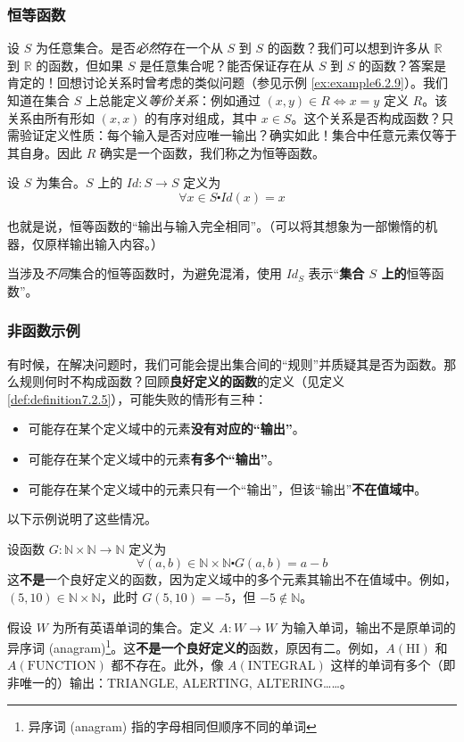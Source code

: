 \subsubsection*{恒等函数}

设 $S$ 为任意集合。是否\emph{必然}存在一个从 $S$ 到 $S$ 的函数？我们可以想到许多从 $\mathbb{R}$ 到 $\mathbb{R}$ 的函数，但如果 $S$ 是任意集合呢？能否保证存在从 $S$ 到 $S$ 的函数？答案是肯定的！回想讨论关系时曾考虑的类似问题（参见示例 \ref{ex:example6.2.9}）。我们知道在集合 $S$ 上总能定义\emph{等价关系}：例如通过 $(x, y) \in R \iff x = y$ 定义 $R$。该关系由所有形如 $(x, x)$ 的有序对组成，其中 $x \in S$。这个关系是否构成函数？只需验证定义性质：每个输入是否对应唯一输出？确实如此！集合中任意元素仅等于其自身。因此 $R$ 确实是一个函数，我们称之为恒等函数。

\begin{definition}[恒等函数]
    设 $S$ 为集合。$S$ 上的 $Id : S \to S$ 定义为
    \[\forall x \in S \centerdot Id(x) = x\]
\end{definition}

也就是说，恒等函数的``输出与输入完全相同''。（可以将其想象为一部懒惰的机器，仅原样输出输入内容。）

当涉及\emph{不同}集合的恒等函数时，为避免混淆，使用 $Id_S$ 表示``\textbf{集合 $S$ 上的}恒等函数''。

\subsubsection*{非函数示例}

有时候，在解决问题时，我们可能会提出集合间的``规则''并质疑其是否为函数。那么规则何时不构成函数？回顾\textbf{良好定义的函数}的定义（见定义 \ref{def:definition7.2.5}），可能失败的情形有三种：

\begin{itemize}
    \item 可能存在某个定义域中的元素\textbf{没有对应的``输出''}。
    \item 可能存在某个定义域中的元素\textbf{有多个``输出''}。
    \item 可能存在某个定义域中的元素只有一个``输出''，但该``输出''\textbf{不在值域中}。
\end{itemize}
以下示例说明了这些情况。

\begin{example}
    设函数 $G : \mathbb{N} \times \mathbb{N} \to \mathbb{N}$ 定义为
    \[\forall (a, b) \in \mathbb{N} \times \mathbb{N} \centerdot G(a, b) = a - b\]
    这\textbf{不是}一个良好定义的函数，因为定义域中的多个元素其输出不在值域中。例如，$(5, 10) \in \mathbb{N} \times \mathbb{N}$，此时 $G(5, 10) = -5$，但 $-5 \notin \mathbb{N}$。
\end{example}

\begin{example}
    假设 $W$ 为所有英语单词的集合。定义 $A: W \to W$ 为输入单词，输出不是原单词的异序词 (anagram)\footnote{异序词 (anagram) 指的字母相同但顺序不同的单词}。这\textbf{不是一个良好定义的}函数，原因有二。例如，$A(\text{HI})$ 和 $A(\text{FUNCTION})$ 都不存在。此外，像 $A(\text{INTEGRAL})$ 这样的单词有多个（即非唯一的）输出：TRIANGLE, ALERTING, ALTERING……。
\end{example}